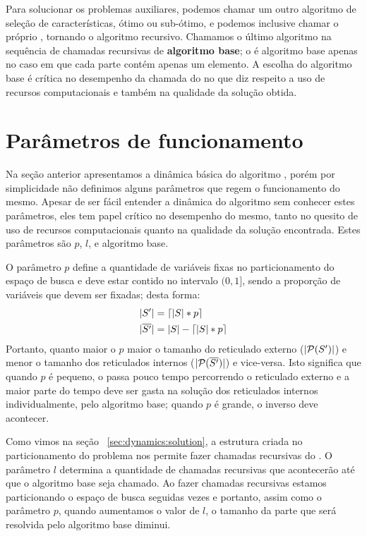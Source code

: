Para solucionar os problemas auxiliares, podemos chamar um outro 
algoritmo de seleção de características, ótimo ou sub-ótimo, e podemos 
inclusive chamar o próprio , tornando o algoritmo 
recursivo. Chamamos o último algoritmo na sequência de chamadas 
recursivas de {\bf algoritmo base}; o  é algoritmo base 
apenas no caso em que cada parte contém apenas um elemento. A escolha do
algoritmo base é crítica no desempenho da chamada do  
no que diz respeito a uso de recursos computacionais e também na 
qualidade da solução obtida.


\section{Parâmetros de funcionamento}
Na seção anterior apresentamos a dinâmica básica do algoritmo 
, porém por simplicidade não definimos alguns parâmetros 
que regem o funcionamento do mesmo. Apesar de ser fácil entender a 
dinâmica do algoritmo sem conhecer estes parâmetros, eles tem papel 
crítico no desempenho do mesmo, tanto no quesito de uso de recursos 
computacionais quanto na qualidade da solução encontrada. Estes 
parâmetros são $p$, $l$, e algoritmo base.

O parâmetro $p$ define a quantidade de variáveis fixas no 
particionamento do espaço de busca e deve estar contido no intervalo 
$(0, 1]$, sendo a proporção de variáveis que devem ser fixadas; desta 
forma:
\begin{align*}
    |S'| & =  \lceil |S| * p \rceil \\
    |\overline{S'}| & = |S| - \lceil |S| * p \rceil \\
\end{align*}
Portanto, quanto maior o $p$ maior o tamanho do reticulado externo 
($|\mathcal{P} (S')|$) e menor o tamanho dos reticulados internos 
($|\mathcal{P}(\overline{S'})|$) e vice-versa. Isto significa que quando 
$p$ é pequeno, o  passa pouco tempo percorrendo o 
reticulado externo e a maior parte do tempo deve ser gasta na solução 
dos reticulados internos individualmente, pelo algoritmo base; quando
$p$ é grande, o inverso deve acontecer.

Como vimos na seção ~\ref{sec:dynamics:solution}, a estrutura criada no
particionamento do problema nos permite fazer chamadas recursivas do 
. O parâmetro $l$ determina a quantidade de chamadas 
recursivas que acontecerão até que o algoritmo base seja chamado. Ao 
fazer chamadas recursivas estamos particionando o espaço de busca 
seguidas vezes e portanto, assim como o parâmetro $p$, quando aumentamos 
o valor de $l$, o tamanho da parte que será resolvida pelo algoritmo 
base diminui. 


